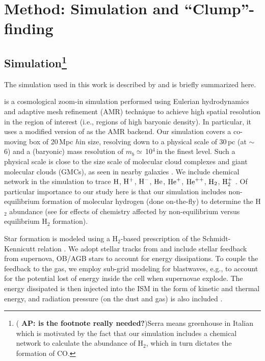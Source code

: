 \documentclass[apj]{emulateapj} %
\newcommand{\AP}[1]{({\bf \color{apcolor} AP: #1})}
\begin{document}
\section{Method: Simulation and ``Clump''-finding} \label{sec:sim}


\subsection{ Simulation\footnote{\AP{is the footnote really needed?}Serra means greenhouse in Italian which is motivated by the
fact that our simulation includes a chemical network to calculate the abundance of H$_2$, which in turn
dictates the formation of CO.
}}
The simulation used in this work is described by \citealt{Pallottini17a} and is briefly summarized here.

 is a cosmological zoom-in simulation performed using Eulerian hydrodynamics and
adaptive mesh refinement (AMR) technique to achieve high spatial resolution in the region of interest (i.e., regions of high baryonic density).
In particular, it uses a modified version of  \citep{Teyssier2002a} as the AMR backend.
Our simulation covers a co-moving box of 20\,Mpc $h$\pmOne in size, resolving down to a physical scale of 30\,pc (at \z$\sim$\,6) and a (baryonic) mass resolution of $m_b\simeq$\,10$^4$\,\Msun in the finest level. Such a physical scale is close to the size scale of molecular cloud complexes and giant molecular clouds (GMCs), as seen in nearby galaxies \citep[e.g.,][]{Sanders85a, Federrath13a, Goodman14a}.
We include chemical network in the simulation to trace $\rm{H}$, $\rm{H}^{+}$, $\rm{H}^{-}$, $\rm{He}$, $\rm{He}^{+}$, $\rm{He}^{++}$, $\rm{H}_2$, $\rm{H}_2^{+}$ \citep{Grassi14a,Bovino16a}.
Of particular importance to our study here is that our simulation includes non-equilibrium formation of molecular hydrogen (done on-the-fly) to determine the H$_2$ abundance (see \citealt{Pallottini17b} for effects of chemistry affected by non-equilibrium versus equilibrium H$_2$ formation).

Star formation is modeled using a H$_2$-based prescription of the Schmidt-Kennicutt relation \citep{Krumholz09a}. We adopt stellar tracks from  and include stellar feedback from supernova, OB/AGB stars to account for energy dissipations. To couple the feedback to the gas, we employ sub-grid modeling for blastwaves, e.g., to account for the potential lost of energy inside the cell when supernovae explode. The energy dissipated is then injected into the ISM in the form of kinetic and thermal energy, and radiation pressure (on the dust and gas) is also included \citep[see][for details]{Pallottini17a}.
\end{document}
